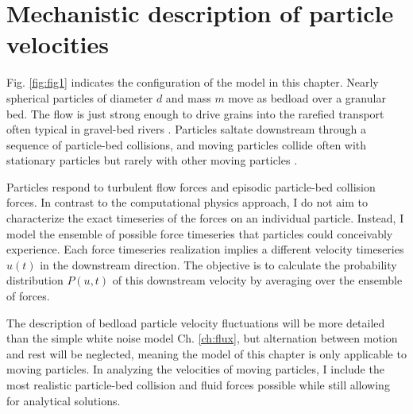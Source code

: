 \section{Mechanistic description of particle velocities}
\label{sec:langmodel}

Fig. \ref{fig:fig1} indicates the configuration of the model in this chapter.
Nearly spherical particles of diameter $d$ and mass $m$ move as bedload over a granular bed.
The flow is just strong enough to drive grains into the rarefied transport often typical in gravel-bed rivers \citep[e.g.][]{Ashworth1989, Warburton1992}. Particles saltate downstream through a sequence of particle-bed collisions, and moving particles collide often with stationary particles but rarely with other moving particles \citep[cf.][]{Williams2021}.

Particles respond to turbulent flow forces and episodic particle-bed collision forces. In contrast to the computational physics approach, I do not aim to characterize the exact timeseries of the forces on an individual particle. Instead, I model the ensemble of possible force timeseries that particles could conceivably experience. Each force timeseries realization implies a different velocity timeseries $u(t)$ in the downstream direction.
The objective is to calculate the probability distribution $P(u,t)$ of this downstream velocity by averaging over the ensemble of forces.

The description of bedload particle velocity fluctuations will be more detailed than the simple white noise model Ch. \ref{ch:flux}, but alternation between motion and rest will be neglected, meaning the model of this chapter is only applicable to moving particles.
In analyzing the velocities of moving particles, I include the most realistic particle-bed collision and fluid forces possible while still allowing for analytical solutions.

